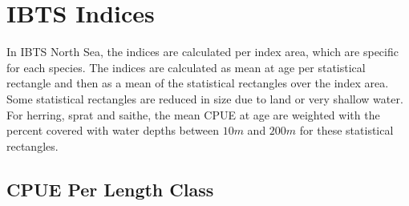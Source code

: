 \documentclass[useAMS,referee]{biom}
\numberwithin{equation}{section}
\begin{document}
\section{IBTS Indices}
In IBTS North Sea, the indices are calculated per index area, which are specific for each species. The indices are calculated as mean at age per statistical rectangle and then as a mean of the statistical rectangles over the index area. Some statistical rectangles are reduced in size due to land or very shallow water. For herring, sprat and saithe, the mean CPUE at age are weighted with the percent covered with water depths between $10m$ and $200m$ for these statistical rectangles. 

\subsection{CPUE Per Length Class }
\end{document}
